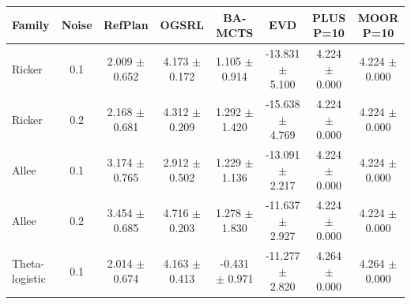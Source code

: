 \documentclass[10pt]{article}
\begin{document}
\begin{table}[p]
\centering
\small
\setlength{\tabcolsep}{3.0pt}
\begin{tabular}{@{}lc*{6}{c}@{}}
\toprule
Family & Noise & RefPlan & OGSRL & BA-MCTS & EVD & PLUS P=10 & MOOR P=10 \\
\midrule
Ricker & 0.1 & \shortstack{2.009\\$\pm$ 0.652} & \shortstack{4.173\\$\pm$ 0.172} & \shortstack{1.105\\$\pm$ 0.914} & \shortstack{-13.831\\$\pm$ 5.100} & \shortstack{4.224\\$\pm$ 0.000} & \shortstack{4.224\\$\pm$ 0.000} \\
Ricker & 0.2 & \shortstack{2.168\\$\pm$ 0.681} & \shortstack{4.312\\$\pm$ 0.209} & \shortstack{1.292\\$\pm$ 1.420} & \shortstack{-15.638\\$\pm$ 4.769} & \shortstack{4.224\\$\pm$ 0.000} & \shortstack{4.224\\$\pm$ 0.000} \\
\addlinespace[1.5pt]
Allee & 0.1 & \shortstack{3.174\\$\pm$ 0.765} & \shortstack{2.912\\$\pm$ 0.502} & \shortstack{1.229\\$\pm$ 1.136} & \shortstack{-13.091\\$\pm$ 2.217} & \shortstack{4.224\\$\pm$ 0.000} & \shortstack{4.224\\$\pm$ 0.000} \\
Allee & 0.2 & \shortstack{3.454\\$\pm$ 0.685} & \shortstack{4.716\\$\pm$ 0.203} & \shortstack{1.278\\$\pm$ 1.830} & \shortstack{-11.637\\$\pm$ 2.927} & \shortstack{4.224\\$\pm$ 0.000} & \shortstack{4.224\\$\pm$ 0.000} \\
\addlinespace[1.5pt]
Theta-logistic & 0.1 & \shortstack{2.014\\$\pm$ 0.674} & \shortstack{4.163\\$\pm$ 0.413} & \shortstack{-0.431\\$\pm$ 0.971} & \shortstack{-11.277\\$\pm$ 2.820} & \shortstack{4.264\\$\pm$ 0.000} & \shortstack{4.264\\$\pm$ 0.000} \\

\end{tabular}
\end{table}
\end{document}
